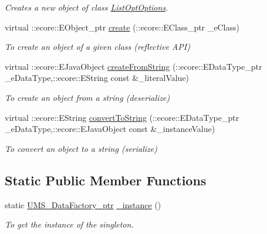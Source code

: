 \begin{DoxyCompactItemize}
\begin{DoxyCompactList}\small\item\em Creates a new object of class \hyperlink{classUMS__Data_1_1ListOptOptions}{ListOptOptions}. \item\end{DoxyCompactList}\item 
virtual ::ecore::EObject\_\-ptr \hyperlink{classUMS__Data_1_1UMS__DataFactory_a2762df5fab9c8a5be5864c5f5b4590ce}{create} (::ecore::EClass\_\-ptr \_\-eClass)
\begin{DoxyCompactList}\small\item\em To create an object of a given class (reflective API) \item\end{DoxyCompactList}\item 
virtual ::ecore::EJavaObject \hyperlink{classUMS__Data_1_1UMS__DataFactory_ab99f89e4aaaf3baa250818052abd959e}{createFromString} (::ecore::EDataType\_\-ptr \_\-eDataType,::ecore::EString const \&\_\-literalValue)
\begin{DoxyCompactList}\small\item\em To create an object from a string (deserialize) \item\end{DoxyCompactList}\item 
virtual ::ecore::EString \hyperlink{classUMS__Data_1_1UMS__DataFactory_ab17ec6caf3557e50c9506d4cacd2f418}{convertToString} (::ecore::EDataType\_\-ptr \_\-eDataType,::ecore::EJavaObject const \&\_\-instanceValue)
\begin{DoxyCompactList}\small\item\em To convert an object to a string (serialize) \item\end{DoxyCompactList}\end{DoxyCompactItemize}
\subsection*{Static Public Member Functions}
\begin{DoxyCompactItemize}
\item 
static \hyperlink{classUMS__Data_1_1UMS__DataFactory}{UMS\_\-DataFactory\_\-ptr} \hyperlink{classUMS__Data_1_1UMS__DataFactory_a73ad8709225ab46ad5ef5e172e0e8a0a}{\_\-instance} ()
\begin{DoxyCompactList}\small\item\em To get the instance of the singleton. \item\end{DoxyCompactList}\end{DoxyCompactItemize}
